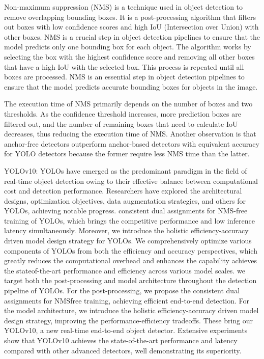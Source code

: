 Non-maximum suppression (NMS) is a technique used in object detection to remove overlapping bounding boxes. It is a post-processing algorithm that filters out boxes with low confidence scores and high IoU (Intersection over Union) with other boxes. NMS is a crucial step in object detection pipelines to ensure that the model predicts only one bounding box for each object. The algorithm works by selecting the box with the highest confidence score and removing all other boxes that have a high IoU with the selected box. This process is repeated until all boxes are processed. NMS is an essential step in object detection pipelines to ensure that the model predicts accurate bounding boxes for objects in the image. 

The execution time of NMS primarily depends on the number of boxes and two thresholds. As the confidence threshold increases, more prediction boxes are filtered out, and the number of remaining boxes that need to calculate IoU decreases, thus reducing the execution time of NMS. Another observation is that anchor-free detectors outperform anchor-based detectors with equivalent accuracy for YOLO detectors because the former require less NMS time than the latter.

YOLOv10: YOLOs have emerged as the predominant paradigm in the field of real-time object detection owing to their effective balance between computational cost and detection performance. Researchers have explored the architectural designs, optimization objectives, data augmentation strategies, and others for YOLOs, achieving notable progress. consistent dual assignments for NMS-free training of YOLOs, which brings the competitive performance and low inference latency simultaneously. Moreover, we introduce the holistic efficiency-accuracy driven model design strategy for YOLOs. We comprehensively optimize various components of YOLOs from both the efficiency and accuracy perspectives, which greatly reduces the computational overhead and enhances the capability achieves the stateof-the-art performance and efficiency across various model scales.
we target both the post-processing and model architecture throughout the detection pipeline of YOLOs. For the post-processing, we propose the consistent dual assignments for NMSfree training, achieving efficient end-to-end detection. For the model architecture, we introduce the holistic efficiency-accuracy driven model design strategy, improving the performance-efficiency tradeoffs. These bring our YOLOv10, a new real-time end-to-end object detector. Extensive experiments show that YOLOv10 achieves the state-of-the-art performance and latency compared with other advanced detectors, well demonstrating its superiority. 

